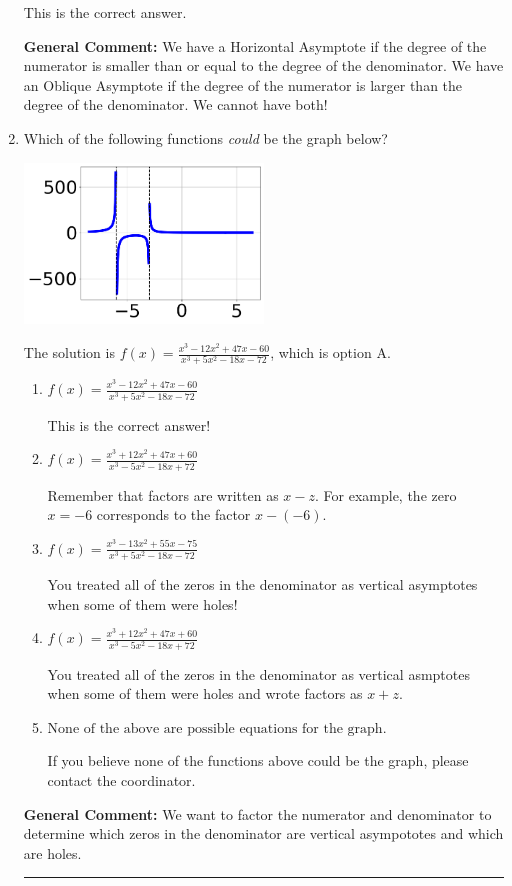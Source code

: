 \documentclass{extbook}[14pt]
\newcommand{\litem}[1]{\item #1

\rule{\textwidth}{0.4pt}}
\begin{document}
\begin{enumerate}
{\begin{enumerate}[label=\Alph*.]
This is the correct answer.
\end{enumerate}

\textbf{General Comment:} We have a Horizontal Asymptote if the degree of the numerator is smaller than or equal to the degree of the denominator. We have an Oblique Asymptote if the degree of the numerator is larger than the degree of the denominator. We cannot have both!
}
\litem{
Which of the following functions \textit{could} be the graph below?

\begin{center}
    \includegraphics[width=0.5\textwidth]{../Figures/identifyGraphOfRationalFunctionB.png}
\end{center}


The solution is \( f(x)=\frac{x^{3} -12 x^{2} +47 x -60}{x^{3} +5 x^{2} -18 x -72} \), which is option A.\begin{enumerate}[label=\Alph*.]
\item \( f(x)=\frac{x^{3} -12 x^{2} +47 x -60}{x^{3} +5 x^{2} -18 x -72} \)

This is the correct answer!
\item \( f(x)=\frac{x^{3} +12 x^{2} +47 x + 60}{x^{3} -5 x^{2} -18 x + 72} \)

Remember that factors are written as $x-z$. For example, the zero $x=-6$ corresponds to the factor $x-(-6)$.
\item \( f(x)=\frac{x^{3} -13 x^{2} +55 x -75}{x^{3} +5 x^{2} -18 x -72} \)

You treated all of the zeros in the denominator as vertical asymptotes when some of them were holes!
\item \( f(x)=\frac{x^{3} +12 x^{2} +47 x + 60}{x^{3} -5 x^{2} -18 x + 72} \)

You treated all of the zeros in the denominator as vertical asmptotes when some of them were holes and wrote factors as $x+z$.
\item \( \text{None of the above are possible equations for the graph.} \)

If you believe none of the functions above could be the graph, please contact the coordinator.
\end{enumerate}

\textbf{General Comment:} We want to factor the numerator and denominator to determine which zeros in the denominator are vertical asympototes and which are holes.
}
\end{enumerate}
\end{document}
